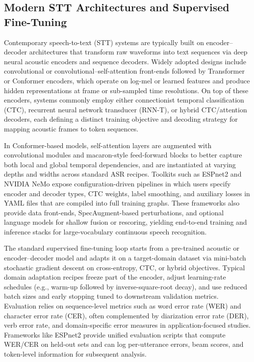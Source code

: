 \documentclass[conference]{IEEEtran}
\begin{document}
\label{sec:background}

\subsection{Modern STT Architectures and Supervised Fine-Tuning}

Contemporary speech-to-text (STT) systems are typically built on encoder--decoder architectures that transform raw waveforms into text sequences via deep neural acoustic encoders and sequence decoders. Widely adopted designs include convolutional or convolutional–self-attention front-ends followed by Transformer or Conformer encoders, which operate on log-mel or learned features and produce hidden representations at frame or sub-sampled time resolutions. On top of these encoders, systems commonly employ either connectionist temporal classification (CTC), recurrent neural network transducer (RNN-T), or hybrid CTC/attention decoders, each defining a distinct training objective and decoding strategy for mapping acoustic frames to token sequences.

In Conformer-based models, self-attention layers are augmented with convolutional modules and macaron-style feed-forward blocks to better capture both local and global temporal dependencies, and are instantiated at varying depths and widths across standard ASR recipes. Toolkits such as ESPnet2 and NVIDIA NeMo expose configuration-driven pipelines in which users specify encoder and decoder types, CTC weights, label smoothing, and auxiliary losses in YAML files that are compiled into full training graphs. These frameworks also provide data front-ends, SpecAugment-based perturbations, and optional language models for shallow fusion or rescoring, yielding end-to-end training and inference stacks for large-vocabulary continuous speech recognition.

The standard supervised fine-tuning loop starts from a pre-trained acoustic or encoder–decoder model and adapts it on a target-domain dataset via mini-batch stochastic gradient descent on cross-entropy, CTC, or hybrid objectives. Typical domain adaptation recipes freeze part of the encoder, adjust learning-rate schedules (e.g., warm-up followed by inverse-square-root decay), and use reduced batch sizes and early stopping tuned to downstream validation metrics. Evaluation relies on sequence-level metrics such as word error rate (WER) and character error rate (CER), often complemented by diarization error rate (DER), verb error rate, and domain-specific error measures in application-focused studies. Frameworks like ESPnet2 provide unified evaluation scripts that compute WER/CER on held-out sets and can log per-utterance errors, beam scores, and token-level information for subsequent analysis.
\end{document}
